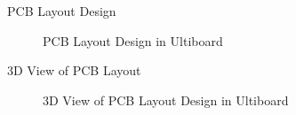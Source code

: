 \begin{frame}{PCB Layout Design}
	\begin{figure}
		\centering


		\caption{PCB Layout Design in Ultiboard}
	\end{figure}
\end{frame}

\begin{frame}{3D View of PCB Layout}
	\begin{figure}
		\centering


		\caption{3D View of PCB Layout Design in Ultiboard}

	\end{figure}
\end{frame}



